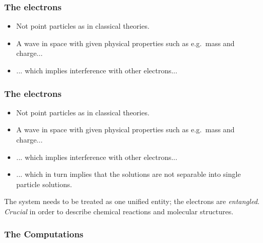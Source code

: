 \documentclass[
paper=128mm:96mm, %
fontsize=11pt, %
pagesize, %
parskip=half-, %
]{scrartcl} %
\theoremstyle{mythmstyle} %
\begin{document}
\clearpage




\subsubsection*{The electrons}

\begin{itemize}
\item  Not point particles as in classical theories.
\item  A wave in space with given physical properties such as e.g.~mass and charge...
\item  ... which implies interference with other electrons...
\end{itemize}

\clearpage


\subsubsection*{The electrons}

\begin{itemize}
\item  Not point particles as in classical theories.
\item  A wave in space with given physical properties such as e.g.~mass and charge...
\item  ... which implies interference with other electrons...
\item  ... which in turn implies that the solutions are not separable into single particle solutions.
\end{itemize}

\clearpage


The system needs to be treated as one unified entity; the electrons are \textit{entangled}.\\
\textit{Crucial} in order to describe chemical reactions and molecular structures.


\clearpage


\subsubsection*{The Computations}
\end{document}
